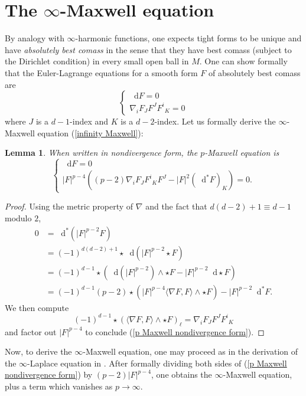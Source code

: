 \documentclass[reqno,11pt]{amsart}
\newcommand*\dif{\mathop{}\!\mathrm{d}}
\newcommand{\dfn}[1]{\emph{#1}\index{#1}}
\newtheorem{lemma}[theorem]{Lemma}
\theoremstyle{definition}
\numberwithin{equation}{section}
\begin{document}
\section{The \texorpdfstring{$\infty$-Maxwell equation}{infinity-Maxwell equation}}
By analogy with $\infty$-harmonic functions, one expects tight forms to be unique and have \dfn{absolutely best comass} in the sense that they have best comass (subject to the Dirichlet condition) in every small open ball in $M$.
One can show formally that the Euler-Lagrange equations for a smooth form $F$ of absolutely best comass are
\begin{equation}\label{infinity Maxwell}
\begin{cases}
\dif F = 0\\
\nabla_i F_J F^J {F^i}_K = 0
\end{cases}
\end{equation}
where $J$ is a $d - 1$-index and $K$ is a $d - 2$-index.
Let us formally derive the $\infty$-Maxwell equation (\ref{infinity Maxwell}):

\begin{lemma}
When written in nondivergence form, the $p$-Maxwell equation is 
\begin{equation}\label{p Maxwell nondivergence form}
\begin{cases}
\dif F = 0\\ 
|F|^{p - 4} ((p - 2) \nabla_i F_J {F^i}_K F^J - |F|^2 (\dif^* F)_K) = 0.
\end{cases}
\end{equation}
\end{lemma}
\begin{proof}
Using the metric property of $\nabla$ and the fact that $d(d - 2) + 1 \equiv d - 1$ modulo $2$,
\begin{align*}
0 &= \dif^*(|F|^{p - 2} F) \\
&= (-1)^{d(d - 2) + 1} \star \dif(|F|^{p - 2} \star F) \\
&= (-1)^{d - 1} \star(\dif(|F|^{p - 2}) \wedge \star F - |F|^{p - 2} \dif \star F) \\
&= (-1)^{d - 1} (p - 2) \star(|F|^{p - 4} \langle \nabla F, F\rangle \wedge \star F) - |F|^{p - 2} \dif^* F.
\end{align*}
We then compute 
$$(-1)^{d - 1} \star(\langle \nabla F, F\rangle \wedge \star F)_\ell = \nabla_i F_J F^J {F^i}_K$$
and factor out $|F|^{p - 4}$ to conclude (\ref{p Maxwell nondivergence form}).
\end{proof}

Now, to derive the $\infty$-Maxwell equation, one may proceed as in the derivation of the $\infty$-Laplace equation in \cite{Barron08}.
After formally dividing both sides of (\ref{p Maxwell nondivergence form}) by $(p - 2) |F|^{p - 4}$, one obtains the $\infty$-Maxwell equation, plus a term which vanishes as $p \to \infty$.
\end{document}
